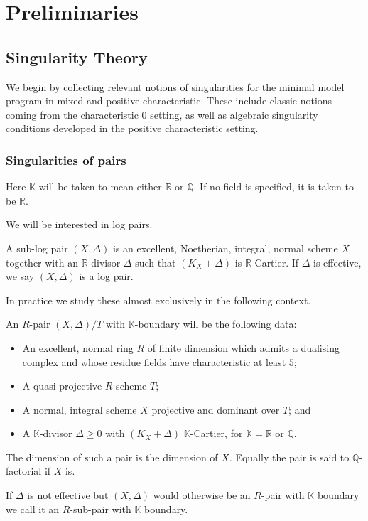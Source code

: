 \documentclass[a4paper,12pt]{book}
\begin{document}
\chapter{Preliminaries}
\section{Singularity Theory} \label{Sings}

We begin by collecting relevant notions of singularities for the minimal model program in mixed and positive characteristic. These include classic notions coming from the characteristic $0$ setting, as well as algebraic singularity conditions developed in the positive characteristic setting.

\subsection{Singularities of pairs}
Here $\mathbb{K}$ will be taken to mean either $\mathbb{R}$ or $\mathbb{Q}$. If no field is specified, it is taken to be $\mathbb{R}$.

We will be interested in log pairs. 

\begin{definition}
	
	A sub-log pair $(X,\Delta)$ is an excellent, Noetherian, integral, normal scheme $X$ together with an $\mathbb{R}$-divisor $\Delta$ such that $(K_{X}+\Delta)$ is $\mathbb{R}$-Cartier. If $\Delta$ is effective, we say $(X,\Delta)$ is a log pair.
	
	\end{definition}

In practice we study these almost exclusively in the following context.

\begin{definition}\label{setup}
	An $R$-pair $(X,\Delta)/ T$ with $\mathbb{K}$-boundary will be the following data:
	\begin{itemize}
		\item An excellent, normal ring $R$ of finite dimension which admits a dualising complex and whose residue fields have characteristic at least $5$;
		\item A quasi-projective $R$-scheme $T$;
		\item A normal, integral scheme $X$ projective and dominant over $T$; and
		\item A $\mathbb{K}$-divisor $\Delta \geq 0$ with $(K_{X}+\Delta)$ $\mathbb{K}$-Cartier, for $\mathbb{K}=\mathbb{R}$ or $\mathbb{Q}$.
	\end{itemize}
	
	The dimension of such a pair is the dimension of $X$. Equally the pair is said to $\mathbb{Q}$-factorial if $X$ is.
	
	If $\Delta$ is not effective but $(X,\Delta)$ would otherwise be an $R$-pair with $\mathbb{K}$ boundary we call it an $R$-sub-pair with $\mathbb{K}$ boundary.
\end{definition}
\end{document}
